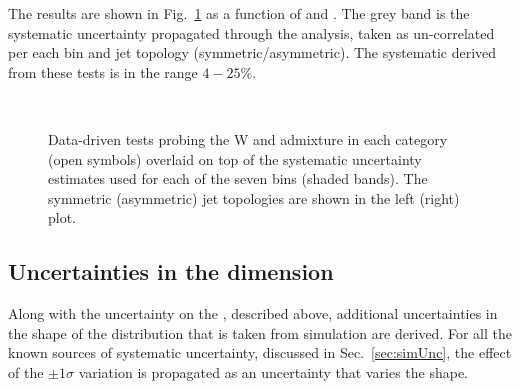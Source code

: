 The results are shown in Fig.~\ref{fig:closureBTag} as a function of
\HT and \njet.  The grey band is the systematic uncertainty
propagated through the analysis, taken as un-correlated per each
\scalht bin and jet topology (symmetric/asymmetric). The systematic
derived from these tests is in the range $4-25\%$.

\begin{figure}[h!]
  \begin{center}
    ~~
    \caption{Data-driven tests probing the W and \ttbar admixture 
      in each \njet category (open symbols) overlaid on top of the systematic
      uncertainty estimates used for each of the seven \scalht bins
      (shaded bands). 
      The symmetric (asymmetric) jet topologies are shown in the left (right) plot.      
    }
    \label{fig:closureBTag}
  \end{center} 
\end{figure}

\subsection{Uncertainties in the \MHT dimension}
\label{sec:systMht}

Along with the uncertainty on the \TFs, described above, additional
uncertainties in the shape of the \MHT distribution that is taken from
simulation are derived. For all the known sources of systematic
uncertainty, discussed in Sec.~\ref{sec:simUnc}, the effect of the $\pm 1\sigma$
variation is propagated as an uncertainty that varies the \MHT shape.

